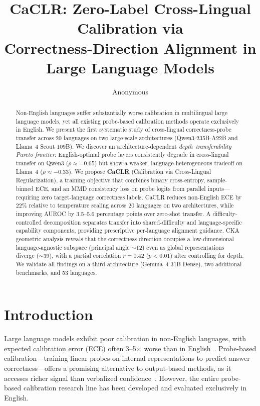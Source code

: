 \documentclass[11pt,a4paper]{article}
\title{CaCLR: Zero-Label Cross-Lingual Calibration via\\Correctness-Direction Alignment in Large Language Models}
\author{Anonymous}
\date{}
\begin{document}
\maketitle

\begin{abstract}
Non-English languages suffer substantially worse calibration in multilingual large language models, yet all existing probe-based calibration methods operate exclusively in English.
We present the first systematic study of cross-lingual correctness-probe transfer across 20 languages on two large-scale architectures (Qwen3-235B-A22B and Llama~4 Scout 109B).
We discover an architecture-dependent \emph{depth--transferability Pareto frontier}: English-optimal probe layers consistently degrade in cross-lingual transfer on Qwen3 ($\rho \approx -0.65$) but show a weaker, language-heterogeneous tradeoff on Llama~4 ($\rho \approx -0.33$).
We propose \textbf{CaCLR} (Calibration via Cross-Lingual Regularization), a training objective that combines binary cross-entropy, sample-binned ECE, and an MMD consistency loss on probe logits from parallel inputs---requiring zero target-language correctness labels.
CaCLR reduces non-English ECE by 22\% relative to temperature scaling across 20 languages on two architectures, while improving AUROC by 3.5--5.6 percentage points over zero-shot transfer.
A difficulty-controlled decomposition separates transfer into shared-difficulty and language-specific capability components, providing prescriptive per-language alignment guidance.
CKA geometric analysis reveals that the correctness direction occupies a low-dimensional language-agnostic subspace (principal angle $\sim$12\textdegree) even as global representations diverge ($\sim$39\textdegree), with a partial correlation $r=0.42$ ($p<0.01$) after controlling for depth.
We validate all findings on a third architecture (Gemma~4 31B Dense), two additional benchmarks, and 53 languages.
\end{abstract}

\section{Introduction}

Large language models exhibit poor calibration in non-English languages, with expected calibration error (ECE) often 3--5$\times$ worse than in English~\citep{huang2023look}.
Probe-based calibration---training linear probes on internal representations to predict answer correctness---offers a promising alternative to output-based methods, as it accesses richer signal than verbalized confidence~\citep{miao2026correctness}.
However, the entire probe-based calibration research line has been developed and evaluated exclusively in English.
\end{document}
